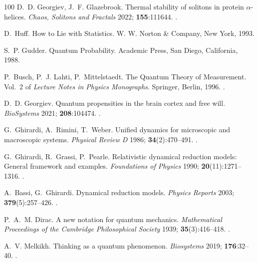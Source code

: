 \documentclass{ws-ijmpb}
\begin{document}
\begin{thebibliography}{100}
D.~D. Georgiev, J.~F. Glazebrook. Thermal stability of solitons in protein
  $\alpha$-helices. \emph{Chaos, Solitons and Fractals} 2022;
  \textbf{155}:111644.
\newblock \href {http://doi.org/10.1016/j.chaos.2021.111644}
  {}.

D.~Huff. How to Lie with Statistics. W. W. Norton \& Company, New York, 1993.

S.~P. Gudder. Quantum Probability. Academic Press, San Diego, California, 1988.

P.~Busch, P.~J. Lahti, P.~Mittelstaedt. The Quantum Theory of Measurement.
  Vol.~2 of \emph{Lecture Notes in Physics Monographs}. Springer, Berlin, 1996.
\newblock \href {http://doi.org/10.1007/978-3-540-37205-9}
  {}.

D.~D. Georgiev. Quantum propensities in the brain cortex and free will.
  \emph{BioSystems} 2021; \textbf{208}:104474.
\newblock \href {http://doi.org/10.1016/j.biosystems.2021.104474}
  {}.

G.~Ghirardi, A.~Rimini, T.~Weber. Unified dynamics for microscopic and
  macroscopic systems. \emph{Physical Review D} 1986; \textbf{34}(2):470--491.
\newblock \href {http://doi.org/10.1103/PhysRevD.34.470}
  {}.

G.~Ghirardi, R.~Grassi, P.~Pearle. Relativistic dynamical reduction models:
  General framework and examples. \emph{Foundations of Physics} 1990;
  \textbf{20}(11):1271--1316.
\newblock \href {http://doi.org/10.1007/bf01883487}
  {}.

A.~Bassi, G.~Ghirardi. Dynamical reduction models. \emph{Physics Reports} 2003;
  \textbf{379}(5):257--426.
\newblock \href {http://doi.org/10.1016/S0370-1573(03)00103-0}
  {}.

P.~A.~M. Dirac. A new notation for quantum mechanics. \emph{Mathematical
  Proceedings of the Cambridge Philosophical Society} 1939;
  \textbf{35}(3):416--418.
\newblock \href {http://doi.org/10.1017/S0305004100021162}
  {}.

A.~V. Melkikh. Thinking as a quantum phenomenon. \emph{Biosystems} 2019;
  \textbf{176}:32--40.
\newblock \href {http://doi.org/10.1016/j.biosystems.2018.12.007}
  {}.


\end{thebibliography}
\end{document}
